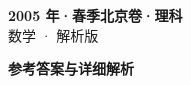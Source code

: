 \documentclass[zihao=-4, a4paper]{ctexart}
\begin{document}
\begin{center}
  {\Large\bfseries 2005 年·春季北京卷·理科}\\[4pt]
  {\large 数学 · 解析版}
\end{center}
\medskip
{}

\clearpage
{}
\begin{center}{\Large\bfseries 参考答案与详细解析}\end{center}
\medskip

\end{document}
